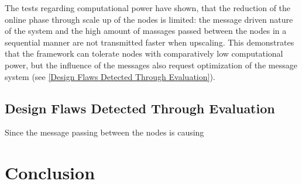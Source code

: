 The tests regarding computational power have shown, that the reduction of the online phase through scale up of the nodes is limited: the message driven nature of the system and the high amount of massages passed between the nodes in a sequential manner are not transmitted faster when upscaling. This demonstrates that the framework can tolerate nodes with comparatively low computational power, but the influence of the messages also request optimization of the message system (see \autoref{Design Flaws Detected Through Evaluation}).

\section{Design Flaws Detected Through Evaluation} \label{Design Flaws Detected Through Evaluation}

Since the message passing between the nodes is causing 
 








\FloatBarrier

\chapter{Conclusion} \label{Conclusion}

